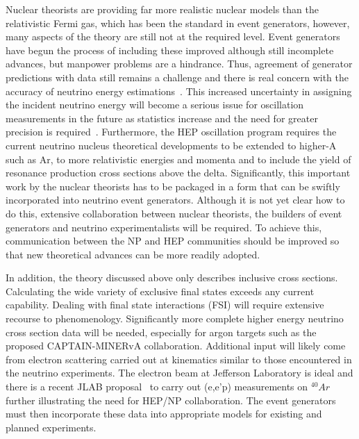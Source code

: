 Nuclear theorists are providing far more realistic nuclear models than
the relativistic Fermi gas, which has been the standard in event
generators, however, many aspects of the theory are still not at the
required level.  Event generators have begun the process of including
these improved although still incomplete advances, but manpower
problems are a hindrance. Thus, agreement of generator predictions
with data still remains a challenge and there is real concern with the
accuracy of neutrino energy
estimations~\cite{Martini:2011wp,Lalakulich:2012hs,Shneor:2007tu}.
This increased uncertainty in assigning the incident neutrino energy
will become a serious issue for oscillation measurements in the future
as statistics increase and the need for greater precision is
required~\cite{1412.4294}.  Furthermore, the HEP oscillation program
requires the current neutrino nucleus theoretical developments to be
extended to higher-A such as Ar, to more relativistic energies and
momenta and to include the yield of resonance production cross
sections above the delta.  Significantly, this important work by the
nuclear theorists has to be packaged in a form that can be swiftly
incorporated into neutrino event generators. Although it is not yet
clear how to do this, extensive collaboration between nuclear
theorists, the builders of event generators and neutrino
experimentalists will be required. To achieve this, communication
between the NP and HEP communities should be improved so that new
theoretical advances can be more readily adopted.

In addition, the theory discussed above only describes inclusive cross
sections. Calculating the wide variety of exclusive final states
exceeds any current capability. Dealing with final state interactions
(FSI) will require extensive recourse to phenomenology.  Significantly
more complete higher energy neutrino cross section data will be
needed, especially for argon targets such as the proposed
CAPTAIN-MINERvA collaboration.  Additional input will likely come from
electron scattering carried out at kinematics similar to those
encountered in the neutrino experiments. The electron beam at
Jefferson Laboratory is ideal and there is a recent JLAB
proposal~\cite{Benhar:2014nca} to carry out (e,e’p) measurements on
$^{40}Ar$ further illustrating the need for HEP/NP collaboration.  The
event generators must then incorporate these data into appropriate
models for existing and planned experiments.
  


